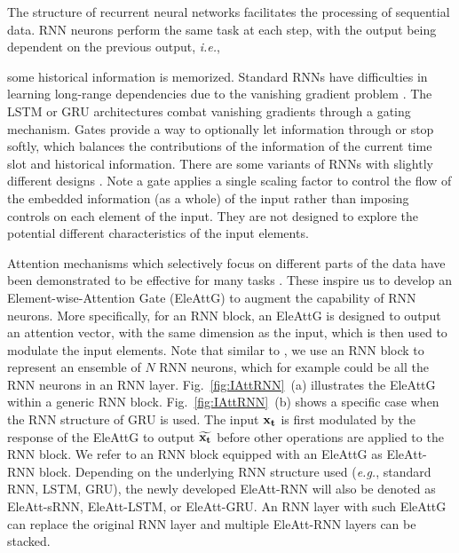 \documentclass[runningheads]{llncs}
\newcommand{\Outer}{Element-wise}
\newcommand{\EleAttGn}{{EleAttG}}
\begin{document}
The structure of recurrent neural networks facilitates the processing of sequential data. RNN neurons perform the same task at each step, with the output being dependent on the previous output, {\it i.e.}, {{some} historical information is memorized. Standard RNNs have difficulties in learning long-range dependencies due to the vanishing gradient problem \cite{jozefowicz2015empirical}. The LSTM \cite{hochreiter1997long} or GRU \cite{cho2014learning} architectures combat vanishing gradients through a gating mechanism. Gates provide a way to optionally let information through or stop softly, which balances the contributions of the information of the current time slot and historical information. There are some variants of RNNs with slightly different designs \cite{jozefowicz2015empirical}. {Note a gate applies a single scaling factor to control the flow of the embedded information (as a whole) of the input rather than imposing controls on each element of the input.} They are not designed to explore the potential different characteristics of the input elements.
	
	Attention mechanisms which selectively focus on different parts
	of the data have been demonstrated to be effective for many tasks \cite{luong2015effective,vaswani2017attention,xu2015show,li2017attentive,sharma2015actionattention,wang2016hierarchical}. These inspire us to develop an \Outer-Attention Gate (\EleAttGn) to augment the capability of RNN neurons. More specifically, for an RNN block, an EleAttG is designed to output an attention vector, with the same dimension as the input, which is then used to modulate the input elements. Note that similar to \cite{LSTMblog}, we use an RNN block to represent an ensemble of $N$ RNN neurons, which for example could be all the RNN neurons in an RNN layer. Fig.~\ref{fig:IAttRNN}~(a) illustrates the EleAttG within a generic RNN block. Fig.~\ref{fig:IAttRNN}~(b) shows a specific case when the RNN structure of GRU is used.  The input $\bf{x}_t$ is first modulated by the response of the EleAttG to output $\widetilde{\bf{x}_t}$ before other operations are applied to the RNN block. We refer to an RNN block equipped with an EleAttG as EleAtt-RNN block. Depending on the underlying RNN structure used ({\it e.g.}, standard RNN, LSTM, GRU), the newly developed EleAtt-RNN will also be denoted as EleAtt-sRNN, EleAtt-LSTM, or EleAtt-GRU. An RNN layer with such EleAttG can replace the original RNN layer and multiple EleAtt-RNN layers can be stacked.

}
\end{document}
